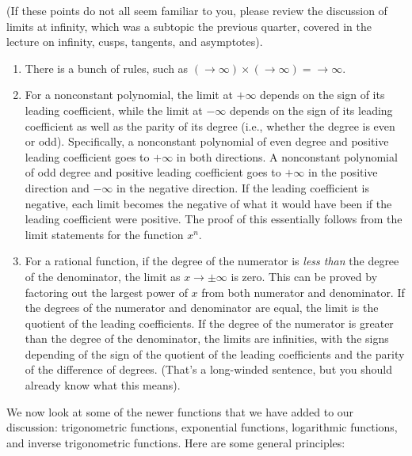 \documentclass[10pt]{amsart}
\begin{document}
(If these points do not all seem familiar to you, please review the
discussion of limits at infinity, which was a subtopic the previous
quarter, covered in the lecture on infinity, cusps, tangents, and
asymptotes).

\begin{enumerate}
\item There is a bunch of rules, such as $(\to \infty) \times (\to
  \infty) = \to \infty$.
\item For a nonconstant polynomial, the limit at $+\infty$ depends on
  the sign of its leading coefficient, while the limit at $-\infty$
  depends on the sign of its leading coefficient as well as the parity
  of its degree (i.e., whether the degree is even or
  odd). Specifically, a nonconstant polynomial of even degree and
  positive leading coefficient goes to $+\infty$ in both directions. A
  nonconstant polynomial of odd degree and positive leading
  coefficient goes to $+\infty$ in the positive direction and
  $-\infty$ in the negative direction. If the leading coefficient is
  negative, each limit becomes the negative of what it would have been
  if the leading coefficient were positive. The proof of this
  essentially follows from the limit statements for the function
  $x^n$.
\item For a rational function, if the degree of the numerator is {\em
  less than} the degree of the denominator, the limit as $x \to \pm
  \infty$ is zero. This can be proved by factoring out the largest
  power of $x$ from both numerator and denominator. If the degrees of
  the numerator and denominator are equal, the limit is the quotient
  of the leading coefficients. If the degree of the numerator is
  greater than the degree of the denominator, the limits are
  infinities, with the signs depending of the sign of the quotient of
  the leading coefficients and the parity of the difference of
  degrees. (That's a long-winded sentence, but you should already know
  what this means).
\end{enumerate}

We now look at some of the newer functions that we have added to our
discussion: trigonometric functions, exponential functions,
logarithmic functions, and inverse trigonometric functions. Here are
some general principles:
\end{document}
